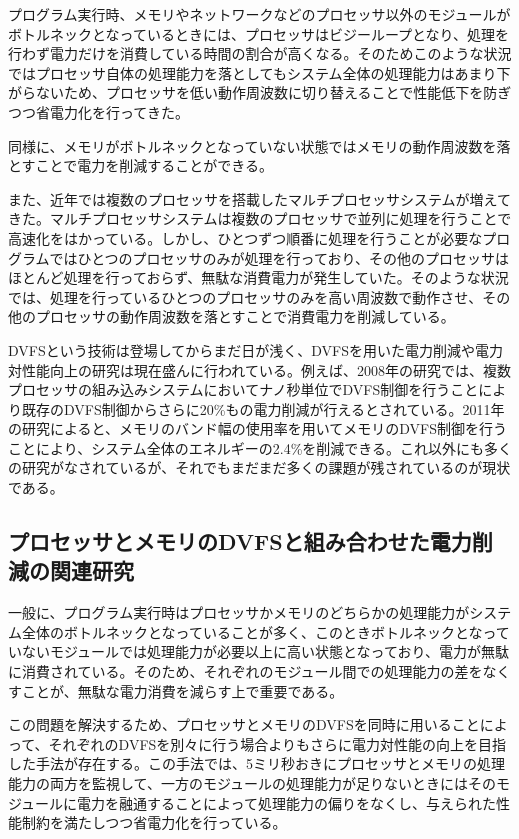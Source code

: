 プログラム実行時、メモリやネットワークなどのプロセッサ以外のモジュールがボトルネックとなっているときには、プロセッサはビジーループとなり、処理を行わず電力だけを消費している時間の割合が高くなる。そのためこのような状況ではプロセッサ自体の処理能力を落としてもシステム全体の処理能力はあまり下がらないため、プロセッサを低い動作周波数に切り替えることで性能低下を防ぎつつ省電力化を行ってきた。

同様に、メモリがボトルネックとなっていない状態ではメモリの動作周波数を落とすことで電力を削減することができる\cite{David:2011:MPM:1998582.1998590}。

また、近年では複数のプロセッサを搭載したマルチプロセッサシステムが増えてきた。マルチプロセッサシステムは複数のプロセッサで並列に処理を行うことで高速化をはかっている。しかし、ひとつずつ順番に処理を行うことが必要なプログラムではひとつのプロセッサのみが処理を行っており、その他のプロセッサはほとんど処理を行っておらず、無駄な消費電力が発生していた。そのような状況では、処理を行っているひとつのプロセッサのみを高い周波数で動作させ、その他のプロセッサの動作周波数を落とすことで消費電力を削減している。

DVFSという技術は登場してからまだ日が浅く、DVFSを用いた電力削減や電力対性能向上の研究は現在盛んに行われている。例えば、2008年の研究では、複数プロセッサの組み込みシステムにおいてナノ秒単位でDVFS制御を行うことにより既存のDVFS制御からさらに20\%もの電力削減が行えるとされている\cite{4658633}。2011年の研究によると、メモリのバンド幅の使用率を用いてメモリのDVFS制御を行うことにより、システム全体のエネルギーの2.4\%を削減できる\cite{David:2011:MPM:1998582.1998590}。これ以外にも多くの研究がなされているが、それでもまだまだ多くの課題が残されているのが現状である。

\subsection{プロセッサとメモリのDVFSと組み合わせた電力削減の関連研究}

一般に、プログラム実行時はプロセッサかメモリのどちらかの処理能力がシステム全体のボトルネックとなっていることが多く、このときボトルネックとなっていないモジュールでは処理能力が必要以上に高い状態となっており、電力が無駄に消費されている。そのため、それぞれのモジュール間での処理能力の差をなくすことが、無駄な電力消費を減らす上で重要である。

この問題を解決するため、プロセッサとメモリのDVFSを同時に用いることによって、それぞれのDVFSを別々に行う場合よりもさらに電力対性能の向上を目指した手法が存在する\cite{6493615}。この手法では、5ミリ秒おきにプロセッサとメモリの処理能力の両方を監視して、一方のモジュールの処理能力が足りないときにはそのモジュールに電力を融通することによって処理能力の偏りをなくし、与えられた性能制約を満たしつつ省電力化を行っている。



